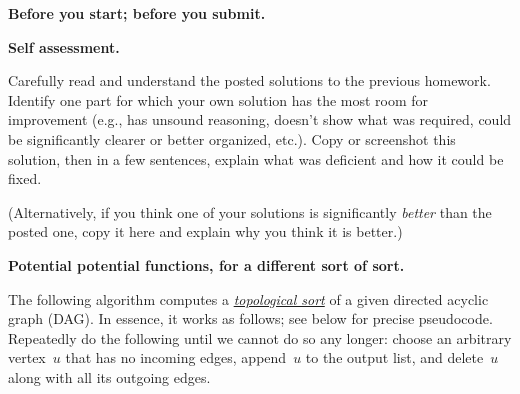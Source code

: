 \documentclass[11pt,addpoints]{exam}
\begin{document}
\hwpreface

\pointsinmargin
{}
\marginpointname{ \points}
\marginbonuspointname{ \bonuspoints}

\begin{questions}
  \addtocounter{question}{-1}
  \question[0] \textbf{Before you start; before you submit.}
  

  \question[10] \textbf{Self assessment.}

  Carefully read and understand the posted solutions to the previous homework.
  Identify one part for which your own solution has the most room for improvement (e.g., has unsound reasoning, doesn’t show what was required, could be significantly clearer or better organized, etc.).
  Copy or screenshot this solution, then in a few sentences, explain what was deficient and how it could be fixed.

  (Alternatively, if you think one of your solutions is significantly \emph{better} than the posted one, copy it here and explain why you think it is better.)

  \begin{solution}
      
  \end{solution}
    
  \question \textbf{Potential potential functions, for a different sort of sort.}
  
  The following algorithm computes a \href{https://en.wikipedia.org/wiki/Topological_sorting}{\emph{topological sort}} of a given directed acyclic graph (DAG).
  In essence, it works as follows; see below for precise pseudocode.
  Repeatedly do the following until we cannot do so any longer: choose an arbitrary vertex~$u$ that has no incoming edges, append~$u$ to the output list, and delete~$u$ along with all its outgoing edges.


\end{questions}
\end{document}
